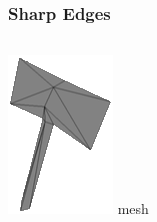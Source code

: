 \begin{frame}\frametitle{Sharp Edges}
	\begin{columns}
		\begin{column}[b]{0.22\textwidth}
			\begin{center}
				\includegraphics[width=\textwidth]{./img/2_mesh/bluntAxeMesh.png}
				\small{mesh}
			\end{center}	
		\end{column}
		\begin{column}[b]{0.22\textwidth}
			\begin{center}

\end{center}
\end{column}
\end{columns}
\end{frame}
